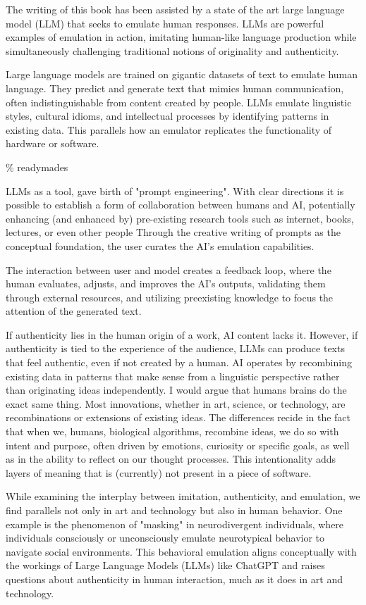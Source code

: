 The writing of this book has been assisted by a state of the art large language model (LLM) that seeks to emulate human responses. LLMs are powerful examples of emulation in action, imitating human-like language production while simultaneously challenging traditional notions of originality and authenticity. 

Large language models are trained on gigantic datasets of text to emulate human language. They predict and generate text that mimics human communication, often indistinguishable from content created by people. LLMs emulate linguistic styles, cultural idioms, and intellectual processes by identifying patterns in existing data. This parallels how an emulator replicates the functionality of hardware or software.

{\scriptsize \textcolor{comment}{\% readymades }}

LLMs as a tool, gave birth of "prompt engineering". With clear directions it is possible to establish a form of collaboration between humans and AI, potentially enhancing (and enhanced by) pre-existing research tools such as internet, books, lectures, or even other people Through the creative writing of prompts as the conceptual foundation, the user curates the AI's emulation capabilities.

The interaction between user and model creates a feedback loop, where the human evaluates, adjusts, and improves the AI's outputs, validating them through external resources, and utilizing preexisting knowledge to focus the attention of the generated text.

If authenticity lies in the human origin of a work, AI content lacks it. However, if authenticity is tied to the experience of the audience, LLMs can produce texts that feel authentic, even if not created by a human. AI operates by recombining existing data in patterns that make sense from a linguistic perspective rather than originating ideas independently. I would argue that humans brains do the exact same thing. Most innovations, whether in art, science, or technology, are recombinations or extensions of existing ideas. The differences recide in the fact that when we, humans, biological algorithms, recombine ideas, we do so with intent and purpose, often driven by emotions, curiosity or specific goals, as well as in the ability to reflect on our thought processes. This intentionality adds layers of meaning that is (currently) not present in a piece of software. 

While examining the interplay between imitation, authenticity, and emulation, we find parallels not only in art and technology but also in human behavior. One example is the phenomenon of "masking" in neurodivergent individuals, where individuals consciously or unconsciously emulate neurotypical behavior to navigate social environments. This behavioral emulation aligns conceptually with the workings of Large Language Models (LLMs) like ChatGPT and raises questions about authenticity in human interaction, much as it does in art and technology.